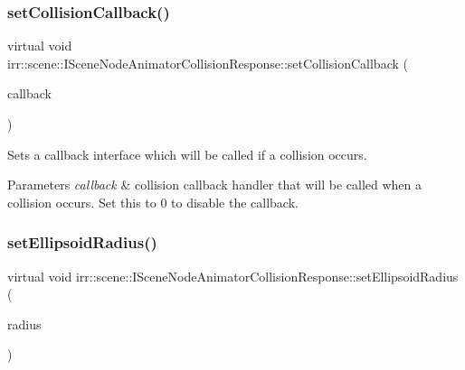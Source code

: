 \subsubsection{\texorpdfstring{set\+Collision\+Callback()}{setCollisionCallback()}}
{\footnotesize\ttfamily virtual void irr\+::scene\+::\+I\+Scene\+Node\+Animator\+Collision\+Response\+::set\+Collision\+Callback (\begin{DoxyParamCaption}\item[{\hyperlink{classirr_1_1scene_1_1ICollisionCallback}{I\+Collision\+Callback} $\ast$}]{callback }\end{DoxyParamCaption})\hspace{0.3cm}{\ttfamily [pure virtual]}}



Sets a callback interface which will be called if a collision occurs. 


\begin{DoxyParams}{Parameters}
{\em callback} & collision callback handler that will be called when a collision occurs. Set this to 0 to disable the callback. \\
\hline
\end{DoxyParams}
\mbox{\label{classirr_1_1scene_1_1ISceneNodeAnimatorCollisionResponse_a71af73590016ba936340a79467690d3f}} 
\subsubsection{\texorpdfstring{set\+Ellipsoid\+Radius()}{setEllipsoidRadius()}}
{\footnotesize\ttfamily virtual void irr\+::scene\+::\+I\+Scene\+Node\+Animator\+Collision\+Response\+::set\+Ellipsoid\+Radius (\begin{DoxyParamCaption}\item[{const \hyperlink{namespaceirr_1_1core_a06f169d08b5c429f5575acb7edbad811}{core\+::vector3df} \&}]{radius }\end{DoxyParamCaption})\hspace{0.3cm}{\ttfamily [pure virtual]}}



